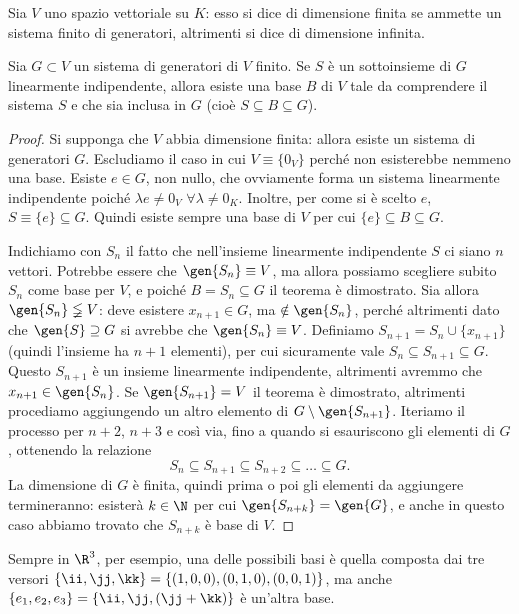 \begin{definizione}
	Sia $V$ uno spazio vettoriale su $K$: esso si dice di dimensione finita se ammette un sistema finito di generatori, altrimenti si dice di dimensione infinita.
\end{definizione}
\begin{teorema} \label{t:esistenza-base}
	Sia $G\subset V$ un sistema di generatori di $V$ finito.
	Se $S$ è un sottoinsieme di $G$ linearmente indipendente, allora esiste una base $B$ di $V$ tale da comprendere il sistema $S$ e che sia inclusa in $G$ (cioè $S\subseteq B\subseteq G$).
\end{teorema}
\begin{proof}
	Si supponga che $V$ abbia dimensione finita: allora esiste un sistema di generatori $G$.
	Escludiamo il caso in cui $V\equiv\{0_V\}$ perché non esisterebbe nemmeno una base.
	Esiste $  e\in G$, non nullo, che ovviamente forma un sistema linearmente indipendente poiché $\lambda  e\neq 0_V$ $\forall\lambda\neq 0_K$.
	Inoltre, per come si è scelto $  e$, $S\equiv\{  e\}\subseteq G$.
	Quindi esiste sempre una base di $V$ per cui $\{  e\}\subseteq B\subseteq G$.

	Indichiamo con $S_n$ il fatto che nell'insieme linearmente indipendente $S$ ci siano $n$ vettori.
	Potrebbe essere che $\gen{S_n}\equiv V$, ma allora possiamo scegliere subito $S_n$ come base per $V$, e poiché $B=S_n\subseteq G$ il teorema è dimostrato.
	Sia allora $\gen{S_n}\lneqq V$: deve esistere $  x_{n+1}\in G$, ma $\notin\gen{S_n}$, perché altrimenti dato che $\gen{S}\supseteq G$ si avrebbe che $\gen{S_n}\equiv V$.
	Definiamo $S_{n+1}=S_n\cup\{  x_{n+1}\}$ (quindi l'insieme ha $n+1$ elementi), per cui sicuramente vale $S_n\subseteq S_{n+1}\subseteq G$. Questo $S_{n+1}$ è un insieme linearmente indipendente, altrimenti avremmo che $  x_{n+1}\in\gen{S_n}$.
	Se $\gen{S_{n+1}}=V$ il teorema è dimostrato, altrimenti procediamo aggiungendo un altro elemento di $G\setminus\gen{S_{n+1}}$.
	Iteriamo il processo per $n+2$, $n+3$ e così via, fino a quando si esauriscono gli elementi di $G$, ottenendo la relazione
	\begin{equation*}
		S_n\subseteq S_{n+1}\subseteq S_{n+2}\subseteq\dots\subseteq G.
	\end{equation*}
	La dimensione di $G$ è finita, quindi prima o poi gli elementi da aggiungere termineranno: esisterà $k\in\N$ per cui $\gen{S_{n+k}}=\gen{G}$, e anche in questo caso abbiamo trovato che $S_{n+k}$ è base di $V$.
\end{proof}
Sempre in $\R^3$, per esempio, una delle possibili basi è quella composta dai tre versori $\{\ii,\jj,\kk\}=\{(1,0,0),(0,1,0),(0,0,1)\}$, ma anche $\{  e_1,  e_2,  e_3\}=\{\ii,\jj,(\jj+\kk)\}$ è un'altra base.
